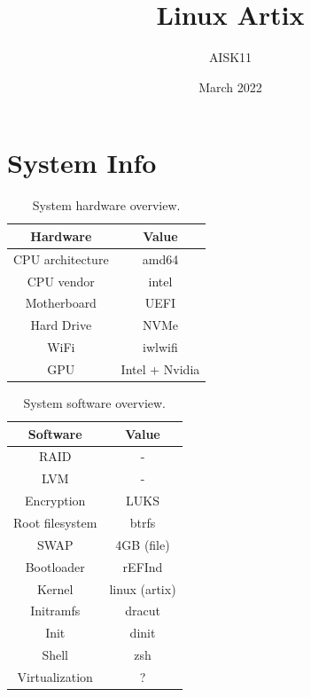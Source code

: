 \documentclass[10pt, a4paper, onecolumn, oneside, titlepage, openany]{book}
\title{\textbf{Linux Artix}}
\author{AISK11}
\date{March 2022}
\begin{document}
\maketitle
\tableofcontents


\chapter{System Info}
\begin{table}[!ht]
\centering
\begin{tabular}{|c|c|}
    \hline
    \textbf{Hardware} & \textbf{Value} \\
    \hline
    CPU architecture & amd64\\
    CPU vendor & intel\\
    Motherboard & UEFI\\
    Hard Drive & NVMe\\
    WiFi & iwlwifi\\
    GPU & Intel + Nvidia\\
    \hline
\end{tabular}
\caption{System hardware overview.}
\label{table:1}
\end{table}

\begin{table}[!ht]
\centering
\begin{tabular}{|c|c|}
    \hline
    \textbf{Software} & \textbf{Value} \\
    \hline
    RAID & -\\
    LVM & -\\
    Encryption & LUKS\\
    Root filesystem & btrfs\\
    SWAP & 4GB (file)\\
    Bootloader & rEFInd\\
    Kernel & linux (artix)\\
    Initramfs & dracut\\
    Init & dinit\\
    Shell & zsh\\
    Virtualization & ?\\
    \hline
\end{tabular}
\caption{System software overview.}
\label{table:2}
\end{table}
\end{document}
